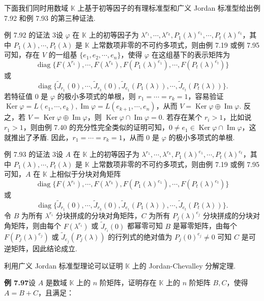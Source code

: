 \documentclass[UTF8, 12pt, fontset=fandol, oneside]{ctexart}
\begin{document}
下面我们同时用数域 $\mathbb{K}$ 上基于初等因子的有理标准型和广义 Jordan 标准型给出例 7.92 和例 7.93 的第三种证法.

例 7.92 的证法 3\quad 设 $\varphi$ 在 $\mathbb{K}$ 上的初等因子为 $\lambda^{r_1},\cdots,\lambda^{r_k},P_1(\lambda)^{e_1},\cdots,P_t(\lambda)^{e_t}$，其中 $P_1(\lambda),\cdots,P_t(\lambda)$ 是 $\mathbb{K}$ 上常数项非零的不可约多项式，则由例 7.19 或例 7.95 可知，存在 $V$ 的一组基 $\{e_1,e_2,\cdots,e_n\}$，使得 $\varphi$ 在这组基下的表示矩阵为
\[
\operatorname{diag}\{F(\lambda^{r_1}),\cdots,F(\lambda^{r_k}),F(P_1(\lambda)^{e_1}),\cdots,F(P_t(\lambda)^{e_t})\}
\]
或
\[
\operatorname{diag}\{\widetilde J_{r_1}(0),\cdots,\widetilde J_{r_k}(0),\widetilde J_{e_1}(P_1(\lambda)),\cdots,\widetilde J_{e_t}(P_t(\lambda))\}.
\]
若特征值 0 是 $\varphi$ 的极小多项式的单根，则 $r_1=\cdots=r_k=1$，容易验证 $\operatorname{Ker}\varphi=L(e_1,\cdots,e_k),\operatorname{Im}\varphi=L(e_{k+1},\cdots,e_n)$，从而 $V=\operatorname{Ker}\varphi\oplus\operatorname{Im}\varphi$. 反之，若 $V=\operatorname{Ker}\varphi\oplus\operatorname{Im}\varphi$，则 $\operatorname{Ker}\varphi\cap\operatorname{Im}\varphi=0$. 若存在某个 $r_i>1$，比如说 $r_1>1$，则由例 7.40 的充分性完全类似的证明可知，$0\ne e_1\in\operatorname{Ker}\varphi\cap\operatorname{Im}\varphi$，这就推出了矛盾. 因此，$r_1=\cdots=r_k=1$，从而 0 是 $\varphi$ 的极小多项式的单根.

例 7.93 的证法 3\quad 设 $A$ 在 $\mathbb{K}$ 上的初等因子为 $\lambda^{r_1},\cdots,\lambda^{r_k},P_1(\lambda)^{e_1},\cdots,P_t(\lambda)^{e_t}$，其中 $P_1(\lambda),\cdots,P_t(\lambda)$ 是 $\mathbb{K}$ 上常数项非零的不可约多项式，则由例 7.19 或例 7.95 可知，$A$ 在 $\mathbb{K}$ 上相似于分块对角矩阵
\[
\operatorname{diag}\{F(\lambda^{r_1}),\cdots,F(\lambda^{r_k}),F(P_1(\lambda)^{e_1}),\cdots,F(P_t(\lambda)^{e_t})\}
\]
或
\[
\operatorname{diag}\{\widetilde J_{r_1}(0),\cdots,\widetilde J_{r_k}(0),\widetilde J_{e_1}(P_1(\lambda)),\cdots,\widetilde J_{e_t}(P_t(\lambda))\}.
\]
令 $B$ 为所有 $\lambda^{r_i}$ 分块拼成的分块对角矩阵，$C$ 为所有 $P_j(\lambda)^{e_j}$ 分块拼成的分块对角矩阵，则由每个 $F(\lambda^{r_i})$ 或 $\widetilde J_{r_i}(0)$ 都幂零可知 $B$ 是幂零矩阵，由每个 $F(P_j(\lambda)^{e_j})$ 或 $\widetilde J_{e_j}(P_j(\lambda))$ 的行列式的绝对值为 $P_j(0)^{e_j}\ne0$ 可知 $C$ 是可逆矩阵，因此结论成立.

利用广义 Jordan 标准型理论可以证明 $\mathbb{K}$ 上的 Jordan-Chevalley 分解定理.

\noindent\textbf{例 7.97}\quad 设 $A$ 是数域 $\mathbb{K}$ 上的 $n$ 阶矩阵，证明存在 $\mathbb{K}$ 上的 $n$ 阶矩阵 $B,C$，使得 $A=B+C$，且满足：
\end{document}
